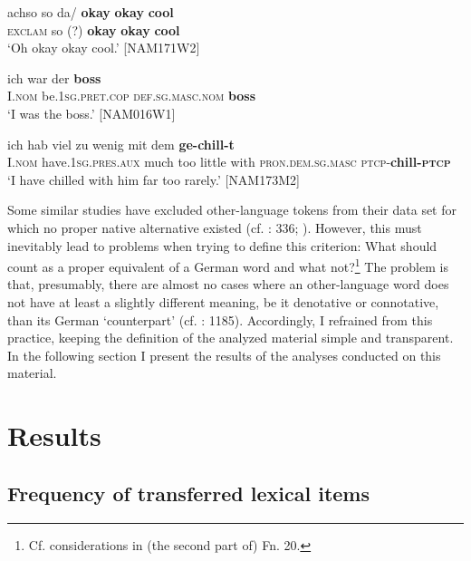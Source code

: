 \documentclass[output=paper]{langsci/langscibook}
\begin{document}
\ea\label{ex:bracke:5}
	\gll achso so da/ \textbf{okay} \textbf{okay} \textbf{cool}     \\
     \textsc{exclam} so (?) \textbf{okay} \textbf{okay} \textbf{cool}\\
	\glt `Oh okay okay cool.' {[}NAM171W2{]}
\z

\ea
\label{ex:bracke:6}
\gll ich war der \textbf{boss}\\
     I.\textsc{nom} be.\textsc{1sg.pret.cop} \textsc{def.sg.masc.nom} \textbf{boss}\\
\glt `I was the boss.' {[}NAM016W1{]}
\z

\ea
\label{ex:bracke:7}
\gll ich hab viel zu wenig mit dem \textbf{ge-chill-t}  \\
     I.\textsc{nom} have.1\textsc{sg.pres.aux} much too little with \textsc{pron.dem.sg.masc} \textsc{ptcp-}\textbf{chill-\textsc{ptcp}}\\
\glt `I have chilled with him far too rarely.' {[}NAM173M2{]}
\z

Some similar studies have excluded other-language tokens from their data set for which no proper native alternative existed (cf. \citealt{zenner_sociolinguistic_2015}: 336; \citealt{calude_modelling_2017}). However, this must inevitably lead to problems when trying to define this criterion: What should count as a proper equivalent of a German word and what not?\footnote{Cf. considerations in (the second part of) Fn. 20.} The problem is that, presumably, there are almost no cases where an other-language word does not have at least a slightly different meaning, be it denotative or connotative, than its German ‘counterpart’ (cf. \citealt{zimmer_deutsch_2019}: 1185). Accordingly, I refrained from this practice, keeping the definition of the analyzed material simple and transparent. In the following section I present the results of the analyses conducted on this material.

 
 \section{Results}
 \label{sec:bracke:5}
 
\subsection{Frequency of transferred lexical items}
 \label{sec:bracke:5.1}
 
\end{document}
